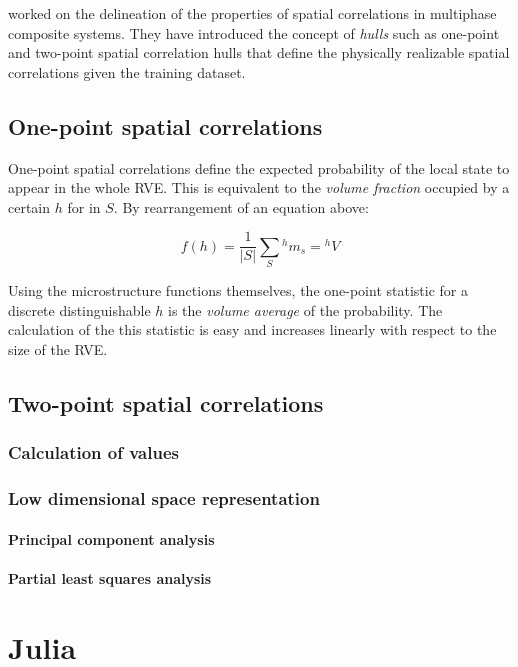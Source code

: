  worked on the delineation of the properties of spatial correlations in multiphase composite systems.
They have introduced the concept of \emph{hulls} such as one-point and two-point spatial correlation hulls that define the physically realizable spatial correlations given the training dataset.

\subsection{One-point spatial correlations}

One-point spatial correlations define the expected probability of the local state to appear in the whole RVE.
This is equivalent to the \emph{volume fraction} occupied by a certain $h$ for in $S$.
By rearrangement of an equation above:

\[
  f(h) = \dfrac{1}{\lvert S\rvert} \sum_{S} {^hm_s} = {^hV}
\]

Using the microstructure functions themselves, the one-point statistic for a discrete distinguishable $h$ is the \emph{volume average} of the probability.
The calculation of the this statistic is easy and increases linearly with respect to the size of the RVE.

\subsection{Two-point spatial correlations}
\subsubsection{Calculation of values}
\subsubsection{Low dimensional space representation}
\paragraph{Principal component analysis}
\paragraph{Partial least squares analysis}


\section{Julia}

